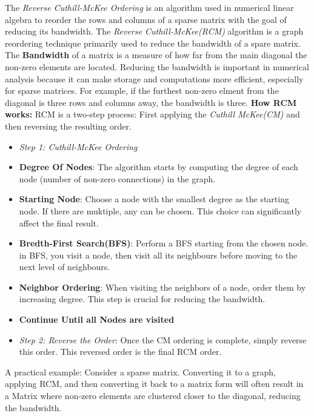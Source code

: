 \documentclass[unicode,11pt,a4paper,oneside,numbers=endperiod,openany]{scrartcl}
\begin{document}
The \textit{Reverse Cuthill-McKee Ordering} is an algorithm used in numerical linear algebra to reorder the rows and columns of a sparse matrix with the goal of reducing its bandwidth.
\newline \newline
The \textit{Reverse Cuthill-McKee(RCM)} algorithm is a graph reordering technique primarily used to reduce the bandwidth of a spare matrix. \newline
The \textbf{Bandwidth} of a matrix is a measure of how far from the main diagonal the non-zero elements are located. Reducing the bandwidth is important in numerical analysis because it can make storage and computations more efficient, especially for sparse matrices. For example, if the furthest non-zero elment from the diagonal is three rows and columns away, the bandwidth is three.
\newline\newline
\textbf{How RCM works:}\newline
RCM is a two-step process: First applying the \textit{Cuthill McKee(CM)} and then reversing the resulting order.
\newline
\begin{itemize}
\item{\textit{Step 1: Cuthill-McKee Ordering}}
 \item {\textbf{Degree Of Nodes}: The algorithm starts by computing the degree of each node (number of non-zero connections) in the graph.}
 \item {\textbf{Starting Node}: Choose a node with the smallest degree as the starting node. If there are muktiple, any can be chosen. This choice can significantly affect the final result.}
 \item{\textbf{Bredth-First Search(BFS)}: Perform a BFS starting from the chosen node. in BFS, you visit a node, then visit all its neighbours before moving to the next level of neighbours.}
 \item{\textbf{Neighbor Ordering}: When visiting the neighbors of a node, order them by increasing degree. This step is crucial for reducing the bandwidth.}
 \item{\textbf{Continue Until all Nodes are visited}}
 \item{\textit{Step 2: Reverse the Order}: \newline Once the CM ordering is complete, simply reverse this order. This reversed order is the final RCM order.}
\end{itemize}

 A practical example:\newline
 Consider a sparse matrix. Converting it to a graph, applying RCM, and then converting it back to a matrix form will often result in a Matrix where non-zero elements are clustered closer to the diagonal, reducing the bandwidth.
\end{document}
